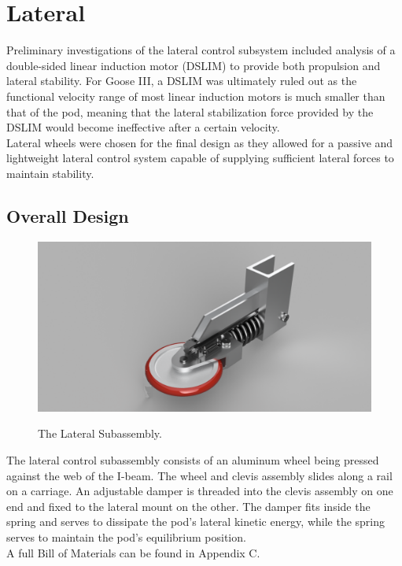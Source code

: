 \documentclass[main.tex]{subfiles}
\begin{document}
    \chapter{Lateral}
    \label{ch:lateral}
    
    Preliminary investigations of the lateral control subsystem included analysis of a double-sided linear induction motor (DSLIM) to provide both propulsion and lateral stability. For Goose III, a DSLIM was ultimately ruled out as the functional velocity range of most linear induction motors is much smaller than that of the pod, meaning that the lateral stabilization force provided by the DSLIM would become ineffective after a certain velocity.\\
    Lateral wheels were chosen for the final design as they allowed for a passive and lightweight lateral control system capable of supplying sufficient lateral forces to maintain stability.

    \section{Overall Design}
    \begin{figure}
    	\centering
        \includegraphics[width=\linewidth]{images/Lateral_Master}
        \label{fig:lateralMaster}
        \caption{The Lateral Subassembly.}
    \end{figure}
    The lateral control subassembly consists of an aluminum wheel being pressed against the web of the I-beam. The wheel and clevis assembly slides along a rail on a carriage. An adjustable damper is threaded into the clevis assembly on one end and fixed to the lateral mount on the other. The damper fits inside the spring and serves to dissipate the pod's lateral kinetic energy, while the spring serves to maintain the pod's equilibrium position.\\
    A full Bill of Materials can be found in Appendix C.
\end{document}
